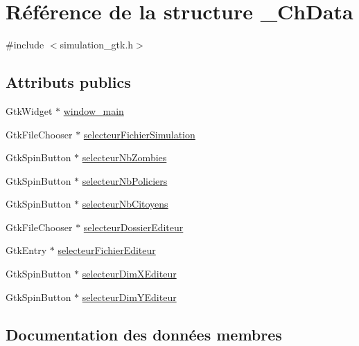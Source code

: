 \hypertarget{struct__ChData}{}\section{Référence de la structure \+\_\+\+Ch\+Data}
\label{struct__ChData}


{\ttfamily \#include $<$simulation\+\_\+gtk.\+h$>$}

\subsection*{Attributs publics}
\begin{DoxyCompactItemize}
\item 
Gtk\+Widget $\ast$ \hyperlink{struct__ChData_a2765de28df11e98c4db8fe24ce15277e}{window\+\_\+main}
\item 
Gtk\+File\+Chooser $\ast$ \hyperlink{struct__ChData_ab56f9a1a642a96e9269edfa9466269fe}{selecteur\+Fichier\+Simulation}
\item 
Gtk\+Spin\+Button $\ast$ \hyperlink{struct__ChData_acf4efb6b68093fe06ac622507877b0be}{selecteur\+Nb\+Zombies}
\item 
Gtk\+Spin\+Button $\ast$ \hyperlink{struct__ChData_aed1b8326d315c4e58e71d173e37617b2}{selecteur\+Nb\+Policiers}
\item 
Gtk\+Spin\+Button $\ast$ \hyperlink{struct__ChData_afd697cfbccba517fa86bb60c0a6d8af4}{selecteur\+Nb\+Citoyens}
\item 
Gtk\+File\+Chooser $\ast$ \hyperlink{struct__ChData_a63850dd7cc845bd8f22997c490ab972f}{selecteur\+Dossier\+Editeur}
\item 
Gtk\+Entry $\ast$ \hyperlink{struct__ChData_a9682df6918aacf1e42275d7d43644b4c}{selecteur\+Fichier\+Editeur}
\item 
Gtk\+Spin\+Button $\ast$ \hyperlink{struct__ChData_a47eb9ca5a635267be7603fc2cfbaa3a5}{selecteur\+Dim\+X\+Editeur}
\item 
Gtk\+Spin\+Button $\ast$ \hyperlink{struct__ChData_acbe22a1c07db7a62f664d47547206b05}{selecteur\+Dim\+Y\+Editeur}
\end{DoxyCompactItemize}


\subsection{Documentation des données membres}

